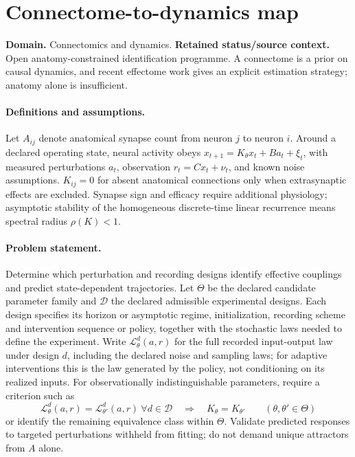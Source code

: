 \documentclass[11pt]{article}
\begin{document}
\section*{Connectome-to-dynamics map}
\label{prob:110}
\label{rank:79}
\par\smallskip

\noindent\textbf{Domain.} Connectomics and dynamics. \quad \textbf{Retained status/source context.} Open anatomy-constrained identification programme. A connectome is a prior on causal dynamics, and recent effectome work gives an explicit estimation strategy; anatomy alone is insufficient.
\paragraph{Definitions and assumptions.} Let $A_{ij}$ denote anatomical synapse count from neuron $j$ to neuron $i$. Around a declared operating state, neural activity obeys $x_{t+1}=K_\theta x_t+B a_t+\xi_t$, with measured perturbations $a_t$, observation $r_t=Cx_t+\nu_t$, and known noise assumptions. $K_{ij}=0$ for absent anatomical connections only when extrasynaptic effects are excluded. Synapse sign and efficacy require additional physiology; asymptotic stability of the homogeneous discrete-time linear recurrence means spectral radius $\rho(K)<1$.
\paragraph{Problem statement.} Determine which perturbation and recording designs identify effective couplings and predict state-dependent trajectories. Let $\Theta$ be the declared candidate parameter family and $\mathcal D$ the declared admissible experimental designs. Each design specifies its horizon or asymptotic regime, initialization, recording scheme and intervention sequence or policy, together with the stochastic laws needed to define the experiment. Write $\mathcal L_\theta^d(a,r)$ for the full recorded input-output law under design $d$, including the declared noise and sampling laws; for adaptive interventions this is the law generated by the policy, not conditioning on its realized inputs. For observationally indistinguishable parameters, require a criterion such as
\[
\mathcal L_\theta^d(a,r)=\mathcal L_{\theta'}^d(a,r)\ \forall d\in\mathcal D
\quad\Longrightarrow\quad
K_\theta=K_{\theta'}
\qquad (\theta,\theta'\in\Theta)
\]
or identify the remaining equivalence class within $\Theta$. Validate predicted responses to targeted perturbations withheld from fitting; do not demand unique attractors from $A$ alone.
\end{document}

